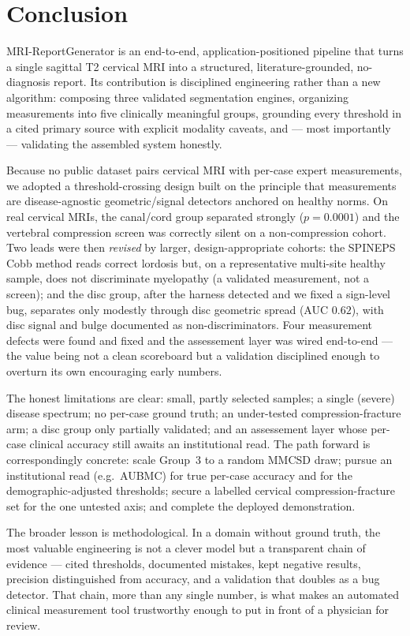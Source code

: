 \section{Conclusion}
\label{sec:conclusion}

MRI-ReportGenerator is an end-to-end, application-positioned pipeline that turns a single sagittal T2
cervical MRI into a structured, literature-grounded, no-diagnosis report. Its contribution is disciplined
engineering rather than a new algorithm: composing three validated segmentation engines, organizing
measurements into five clinically meaningful groups, grounding every threshold in a cited primary source
with explicit modality caveats, and --- most importantly --- validating the assembled system honestly.

Because no public dataset pairs cervical MRI with per-case expert measurements, we adopted a
threshold-crossing design built on the principle that measurements are disease-agnostic geometric/signal
detectors anchored on healthy norms. On real cervical MRIs, the canal/cord group separated strongly
($p=0.0001$) and the vertebral compression screen was correctly silent on a non-compression cohort. Two
leads were then \emph{revised} by larger, design-appropriate cohorts: the SPINEPS Cobb method reads
correct lordosis but, on a representative multi-site healthy sample, does not discriminate myelopathy (a
validated measurement, not a screen); and the disc group, after the harness detected and we fixed a
sign-level bug, separates only modestly through disc geometric spread (AUC $0.62$), with disc signal and
bulge documented as non-discriminators. Four measurement defects were found and fixed and the
assessement layer was wired end-to-end --- the value being not a clean scoreboard but a validation
disciplined enough to overturn its own encouraging early numbers.

The honest limitations are clear: small, partly selected samples; a single (severe) disease spectrum; no
per-case ground truth; an under-tested compression-fracture arm; a disc group only partially validated;
and an assessement layer whose per-case clinical accuracy still awaits an institutional read. The path
forward is correspondingly concrete: scale Group~3 to a random MMCSD draw; pursue an institutional read
(e.g.\ AUBMC) for true per-case accuracy and for the demographic-adjusted thresholds; secure a labelled
cervical compression-fracture set for the one untested axis; and complete the deployed demonstration.

The broader lesson is methodological. In a domain without ground truth, the most valuable engineering is
not a clever model but a transparent chain of evidence --- cited thresholds, documented mistakes, kept
negative results, precision distinguished from accuracy, and a validation that doubles as a bug detector.
That chain, more than any single number, is what makes an automated clinical measurement tool trustworthy
enough to put in front of a physician for review.
